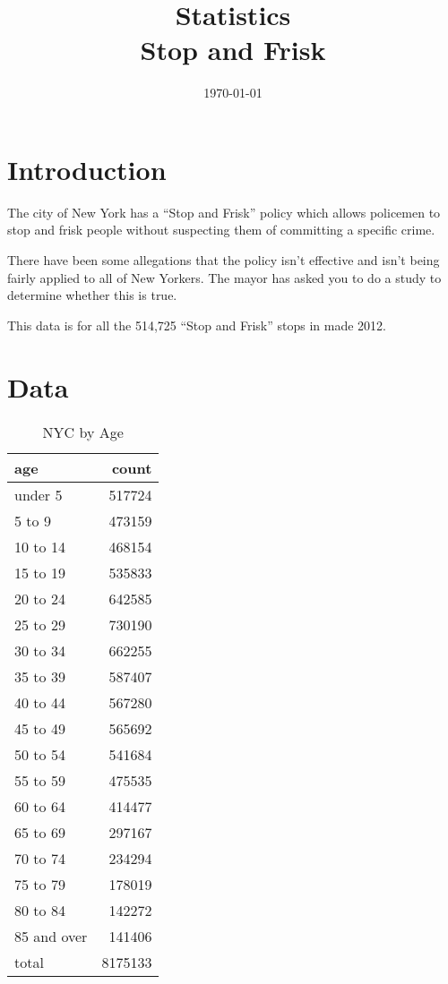 \documentclass[letterpaper]{exam}
\title{Statistics \\ Stop and Frisk}
\date{\today}
\author{}
\begin{document}
  \maketitle

  \section{Introduction}
  The city of New York has a ``Stop and Frisk'' policy which allows policemen to
  stop and frisk people without suspecting them of committing a specific crime.

  There have been some allegations that the policy isn't effective and isn't
  being fairly applied to all of New Yorkers.  The mayor has asked you to do a
  study to determine whether this is true.

  This data is for all the 514,725 ``Stop and Frisk'' stops in made 2012.

  \section{Data}

  \begin{table}[H]
    \centering
    \begin{tabular}{lr}
      \toprule
      age         & count \\
      \midrule
      under 5     & 517724 \\
      5 to 9      & 473159 \\
      10 to 14    & 468154 \\
      15 to 19    & 535833 \\
      20 to 24    & 642585 \\
      25 to 29    & 730190 \\
      30 to 34    & 662255 \\
      35 to 39    & 587407 \\
      40 to 44    & 567280 \\
      45 to 49    & 565692 \\
      50 to 54    & 541684 \\
      55 to 59    & 475535 \\
      60 to 64    & 414477 \\
      65 to 69    & 297167 \\
      70 to 74    & 234294 \\
      75 to 79    & 178019 \\
      80 to 84    & 142272 \\
      85 and over & 141406 \\
      total       & 8175133 \\
      \bottomrule
    \end{tabular}
    \caption{NYC by Age}
  \end{table}
\end{document}
